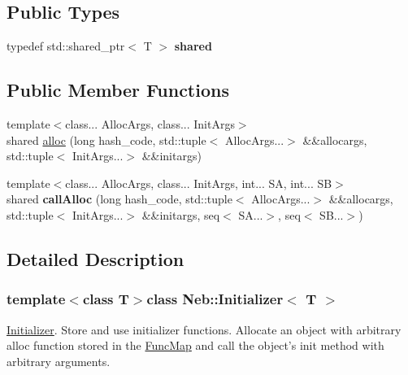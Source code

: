 \subsection*{\-Public \-Types}
\begin{DoxyCompactItemize}
\item 
\hypertarget{classNeb_1_1Initializer_a50e05ce7fe54c798cd00495214bf2df4}{typedef std\-::shared\-\_\-ptr$<$ \-T $>$ {\bfseries shared}}\label{classNeb_1_1Initializer_a50e05ce7fe54c798cd00495214bf2df4}

\end{DoxyCompactItemize}
\subsection*{\-Public \-Member \-Functions}
\begin{DoxyCompactItemize}
\item 
{\footnotesize template$<$class... \-Alloc\-Args, class... \-Init\-Args$>$ }\\shared \hyperlink{classNeb_1_1Initializer_aa6c409694511459956b7cfbc27feb8fc}{alloc} (long hash\-\_\-code, std\-::tuple$<$ \-Alloc\-Args...$>$ \&\&allocargs, std\-::tuple$<$ \-Init\-Args...$>$ \&\&initargs)
\item 
\hypertarget{classNeb_1_1Initializer_ad30f8a193fa13c284fd20cd516ed0b78}{{\footnotesize template$<$class... \-Alloc\-Args, class... \-Init\-Args, int... \-S\-A, int... \-S\-B$>$ }\\shared {\bfseries call\-Alloc} (long hash\-\_\-code, std\-::tuple$<$ \-Alloc\-Args...$>$ \&\&allocargs, std\-::tuple$<$ \-Init\-Args...$>$ \&\&initargs, seq$<$ \-S\-A...$>$, seq$<$ \-S\-B...$>$)}\label{classNeb_1_1Initializer_ad30f8a193fa13c284fd20cd516ed0b78}

\end{DoxyCompactItemize}


\subsection{\-Detailed \-Description}
\subsubsection*{template$<$class T$>$class Neb\-::\-Initializer$<$ T $>$}

\hyperlink{classNeb_1_1Initializer}{\-Initializer}. \-Store and use initializer functions. \-Allocate an object with arbitrary alloc function stored in the \hyperlink{classNeb_1_1FuncMap}{\-Func\-Map} and call the object's {\ttfamily init} method with arbitrary arguments. 

